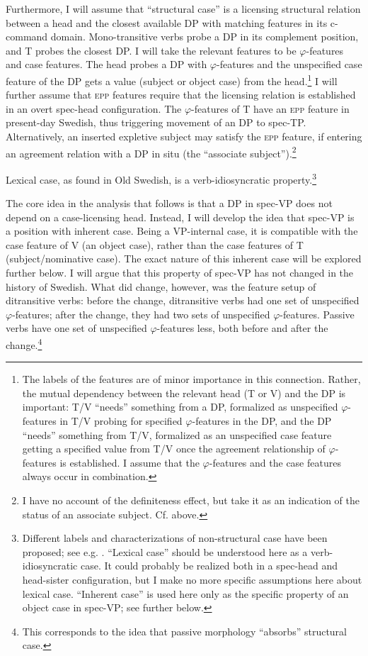 \documentclass[output=paper]{langscibook}
\begin{document}
Furthermore, I will assume that “structural case” is a licensing structural relation between a head and the closest available DP with matching features in its c-command domain. Mono-transitive verbs probe a DP in its complement position, and T probes the closest DP. I will take the relevant features to be $\varphi $-features and case features. The head probes a DP with $\varphi $-features and the unspecified case feature of the DP gets a value (subject or object case) from the head.\footnote{The labels of the features are of minor importance in this connection. Rather, the mutual dependency between the relevant head (T or V) and the DP is important: T/V “needs” something from a DP, formalized as unspecified $\varphi ${}-features in T/V probing for specified $\varphi ${}-features in the DP, and the DP “needs” something from T/V, formalized as an unspecified case feature getting a specified value from T/V once the agreement relationship of $\varphi ${}-features is established. I assume that the $\varphi ${}-features and the case features always occur in combination.} I will further assume that \textsc{epp} features require that the licensing relation is established in an overt spec-head configuration. The $\varphi $-features of T have an \textsc{epp} feature in present-day Swedish, thus triggering movement of an DP to spec-TP. Alternatively, an inserted expletive subject may satisfy the \textsc{epp} feature, if entering an agreement relation with a DP in situ (the “associate subject”).\footnote{I have no account of the definiteness effect, but take it as an indication of the status of an associate subject. Cf.  above.}



Lexical case, as found in Old Swedish, is a verb-idiosyncratic property.\footnote{Different labels and characterizations of non-structural case have been proposed; see e.g. \citet[181–182]{Thrainsson2001}. “Lexical case” should be understood here as a verb-idiosyncratic case. It could probably be realized both in a spec-head and head-sister configuration, but I make no more specific assumptions here about lexical case.  “Inherent case” is used here only as the specific property of an object case in spec-VP; see further below.} 



The core idea in the analysis that follows is that a DP in spec-VP does not depend on a case-licensing head. Instead, I will develop the idea that spec-VP is a position with inherent case. Being a VP-internal case, it is compatible with the case feature of V (an object case), rather than the case features of T (subject/nominative case). The exact nature of this inherent case will be explored further below. I will argue that this property of spec-VP has not changed in the history of Swedish. What did change, however, was the feature setup of ditransitive verbs: before the change, ditransitive verbs had one set of unspecified $\varphi ${}-features; after the change, they had two sets of unspecified $\varphi $-features. Passive verbs have one set of unspecified $\varphi ${}-features less, both before and after the change.\footnote{This corresponds to the idea that passive morphology “absorbs” structural case.}
\end{document}

